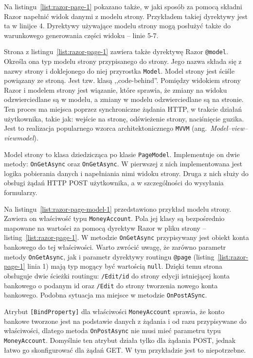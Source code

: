 Na listingu~\ref{list:razor-page-1} pokazano także, w jaki sposób za pomocą składni Razor napełnić widok danymi z modelu strony. Przykładem takiej dyrektywy jest ta w linijce 4. Dyrektywy używające modelu strony mogą posłużyć także do warunkowego generowania części widoku -- linie 5-7.

Strona z listingu~\ref{list:razor-page-1} zawiera także dyrektywę Razor \texttt{@model}. Określa ona typ modelu strony przypisanego do strony. Jego nazwa składa się z nazwy strony i doklejonego do niej przyrostka \texttt{Model}. Model strony jest ściśle powiązany ze stroną. Jest tzw. klasą ,,code-behind''. Pomiędzy widokiem strony Razor i modelem strony jest wiązanie, które sprawia, że zmiany na widoku odzwierciedlane są w modelu, a zmiany w modelu odzwierciedlane są na stronie. Ten proces ma miejsca poprzez synchroniczne żądania HTTP, w trakcie działań użytkownika, takie jak: wejście na stronę, odświeżenie strony, naciśnięcie guzika. Jest to realizacja popularnego wzorca architektonicznego \texttt{MVVM} (ang.~\emph{Model–view–viewmodel}).

Model strony to klasa dziedzicząca po klasie \texttt{PageModel}. Implementuje on dwie metody: \texttt{OnGetAsync} oraz \texttt{OnGetAsync}. W pierwszej z nich implementowana jest logika pobierania danych i napełniania nimi widoku strony. Druga z nich służy do obsługi żądań HTTP POST użytkownika, a w szczególności do wysyłania formularzy. 

Na listingu~\ref{list:razor-page-model-1} przedstawiono przykład modelu strony. Zawiera on właściwość typu \texttt{MoneyAccount}. Pola jej klasy są bezpośrednio mapowane na wartości za pomocą dyrektyw Razor w pliku strony -- listing~\ref{list:razor-page-1}. W metodzie \texttt{OnGetAsync} przypisywany jest obiekt konta bankowego do tej właściwości. Warto zwrócić uwagę, że zarówno parametr metody \texttt{OnGetAsync}, jak i parametr dyrektywy routingu \texttt{@page} (listing~\ref{list:razor-page-1} linia 1) mają typ mogący być wartością \texttt{null}. Dzięki temu strona obsługuje dwie ścieżki routingu: \texttt{/Edit/{id}} do strony edycji istniejącej konta bankowego o podanym id oraz \texttt{/Edit} do strony tworzenia nowego konta bankowego. Podobna sytuacja ma miejsce w metodzie \texttt{OnPostASync}.

Atrybut \texttt{[BindProperty]} dla właściwości \texttt{MoneyAccount} sprawia, że konto bankowe tworzone jest na podstawie danych z żądania i od razu przypisywane do właściwości, dlatego metoda \texttt{OnPostAsync} nie musi mieć parametru typu \texttt{MoneyAccount}. Domyślnie ten atrybut działa tylko dla żądania POST, jednak łatwo go skonfigurować dla żądań GET. W tym przykładzie jest to niepotrzebne.

